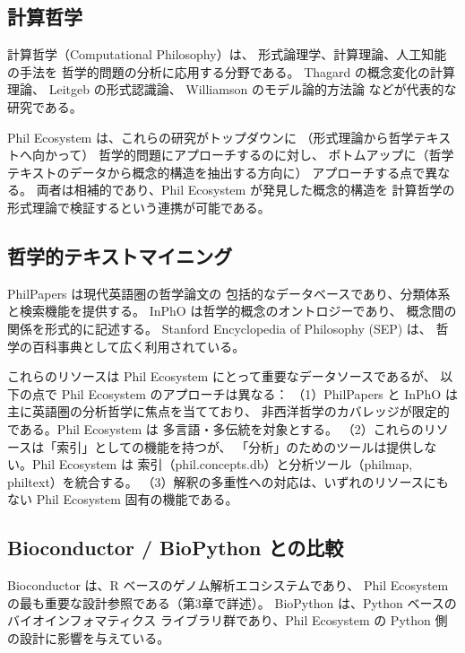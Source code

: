 \documentclass[a4paper,11pt]{ltjsarticle}
\begin{document}
\subsection{計算哲学}

計算哲学（Computational Philosophy）は、
形式論理学、計算理論、人工知能の手法を
哲学的問題の分析に応用する分野である。
Thagard の概念変化の計算理論\cite{thagard1992}、
Leitgeb の形式認識論\cite{leitgeb2017}、
Williamson のモデル論的方法論\cite{williamson2017}
などが代表的な研究である。

Phil Ecosystem は、これらの研究がトップダウンに
（形式理論から哲学テキストへ向かって）
哲学的問題にアプローチするのに対し、
ボトムアップに（哲学テキストのデータから概念的構造を抽出する方向に）
アプローチする点で異なる。
両者は相補的であり、Phil Ecosystem が発見した概念的構造を
計算哲学の形式理論で検証するという連携が可能である。

\subsection{哲学的テキストマイニング}

PhilPapers\cite{bourget2014} は現代英語圏の哲学論文の
包括的なデータベースであり、分類体系と検索機能を提供する。
InPhO\cite{niepert2008} は哲学的概念のオントロジーであり、
概念間の関係を形式的に記述する。
Stanford Encyclopedia of Philosophy (SEP) は、
哲学の百科事典として広く利用されている。

これらのリソースは Phil Ecosystem にとって重要なデータソースであるが、
以下の点で Phil Ecosystem のアプローチは異なる：
（1）PhilPapers と InPhO は主に英語圏の分析哲学に焦点を当てており、
非西洋哲学のカバレッジが限定的である。Phil Ecosystem は
多言語・多伝統を対象とする。
（2）これらのリソースは「索引」としての機能を持つが、
「分析」のためのツールは提供しない。Phil Ecosystem は
索引（phil.concepts.db）と分析ツール（philmap, philtext）を統合する。
（3）解釈の多重性への対応は、いずれのリソースにもない
Phil Ecosystem 固有の機能である。

\subsection{Bioconductor / BioPython との比較}

Bioconductor\cite{huber2015} は、R ベースのゲノム解析エコシステムであり、
Phil Ecosystem の最も重要な設計参照である（第3章で詳述）。
BioPython\cite{cock2009} は、Python ベースのバイオインフォマティクス
ライブラリ群であり、Phil Ecosystem の Python 側の設計に影響を与えている。
\end{document}
